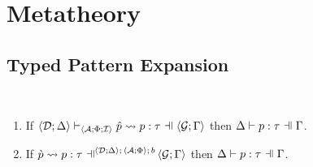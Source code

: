\section{Metatheory}\label{appendix:B-metatheory}
\subsection{Typed Pattern Expansion}\label{appendix:B-typed-pattern-expansion}
\begin{theorem}\label{thm:typed-pattern-expansion-B} ~
\begin{enumerate}
  \item If $\pExpandsSP{\uDD{\uD}{\Delta}}{\uASI{\uA}{\Phi}{\uI}}{\upv}{p}{\tau}{\uGG{\uG}{\pctx}}$ then $\patType{\pctx}{p}{\tau}$.
  \item If $\cvalidP{\uGG{\uG}{\pctx}}{\pscene{\uDD{\uD}{\Delta}}{\uAP{\uA}{\Phi}}{b}}{\cpv}{p}{\tau}$ then $\patType{\pctx}{p}{\tau}$.
\end{enumerate}
\end{theorem}
